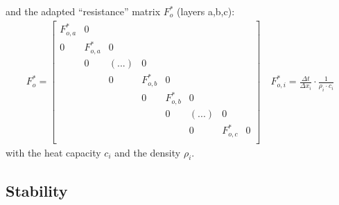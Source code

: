 \documentclass[letterpaper,10pt,english]{jupyterBook}
\begin{document}
\sphinxAtStartPar
and the adapted “resistance” matrix \(F_{o}^*\) (layers a,b,c):
\begin{equation*}
\begin{split} F_{o}^* = \left [ 
\begin{array}{ccccccc}
    F_{o,a}^* & 0\\
    0 & F_{o,a}^*  & 0\\ 
     &  0 &  (...)  & 0\\
      &   &  0 & F_{o,b}^* & 0\\
      &   &    & 0 & F_{o,b}^* & 0\\
      &   &   &    & 0  &  (...) & 0\\
      &   &   &   &    & 0 &  F_{o,c}^* & 0\\
\end{array}
\right]  \quad F_{o,i}^* = \frac{\Delta t}{\Delta x_i} \cdot \frac{1}{\rho_i \cdot c_i}\end{split}
\end{equation*}
\sphinxAtStartPar
with the heat capacity \(c_i\) and the density \(\rho_i\).


\subsection{Stability}
\label{\detokenize{Aufgabe1:stability}}
\end{document}
